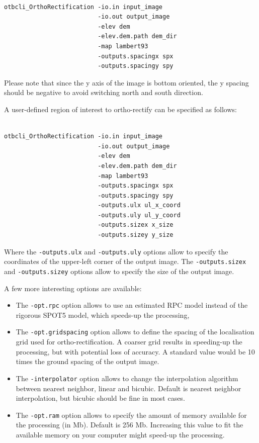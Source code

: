 \begin{verbatim}

otbcli_OrthoRectification -io.in input_image 
                          -io.out output_image 
                          -elev dem
                          -elev.dem.path dem_dir 
                          -map lambert93 
                          -outputs.spacingx spx 
                          -outputs.spacingy spy

\end{verbatim}

Please note that since the y axis of the image is bottom oriented, the
y spacing should be negative to avoid switching north and south direction.

A user-defined region of interest to ortho-rectify can be specified as
follows:

\begin{verbatim}

otbcli_OrthoRectification -io.in input_image 
                          -io.out output_image 
                          -elev dem 
                          -elev.dem.path dem_dir 
                          -map lambert93 
                          -outputs.spacingx spx 
                          -outputs.spacingy spy 
                          -outputs.ulx ul_x_coord 
                          -outputs.uly ul_y_coord 
                          -outputs.sizex x_size 
                          -outputs.sizey y_size

\end{verbatim}

Where the \verb?-outputs.ulx? and \verb?-outputs.uly? options allow to 
specify the coordinates of the upper-left corner of the output image.
The \verb?-outputs.sizex? and \verb?-outputs.sizey? options allow to 
specify the size of the output image.

A few more interesting options are available:
\begin{itemize}
\item The \verb?-opt.rpc? option allows to use an estimated RPC model
  instead of the rigorous SPOT5 model, which speeds-up the processing,
\item The \verb?-opt.gridspacing? option allows to define the spacing of the
  localisation grid used for ortho-rectification. A coarser grid
  results in speeding-up the processing, but with potential loss of
  accuracy. A standard value would be 10 times the ground spacing of 
  the output image.
\item The \verb?-interpolator? option allows to change the interpolation
  algorithm between nearest neighbor, linear and bicubic. Default is nearest 
  neighbor interpolation, but bicubic should be fine in most cases.
\item The \verb?-opt.ram? option allows to specify the amount of memory
  available for the processing (in Mb). Default is 256 Mb. Increasing
  this value to fit the available memory on your computer might
  speed-up the processing.
\end{itemize}

